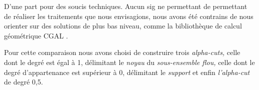 D'une part pour des soucis techniques. Aucun \ac{sig} ne permettant de
permettant de réaliser les traitements que nous envisagions, nous
avons été contrains de nous orienter sur des solutions de plus bas
niveau, comme la bibliothèque de calcul géométrique CGAL
\autocite{CGAL2019}.





Pour cette comparaison nous avons choisi de construire trois
\emph{alpha-cuts,} celle dont le degré est égal à 1, délimitant le
\emph{noyau} du \emph{sous-ensemble flou,} celle dont le degré
d'appartenance est supérieur à 0, délimitant le \emph{support} et
enfin \emph{l'alpha-cut} de degré 0,5.


